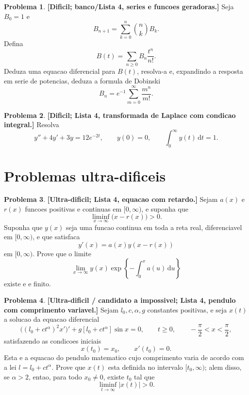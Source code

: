 \documentclass[10pt,a4paper]{amsart}
\renewcommand{\d}{\mathrm{d}}
\theoremstyle{definition}
\newtheorem{problema}{Problema}
\begin{document}
\begin{problema}
\textbf{[Dificil; banco/Lista 4, series e funcoes geradoras.]}
Seja $B_0=1$ e
\[
    B_{n+1}=\sum_{k=0}^n \binom{n}{k}B_k.
\]
Defina
\[
    B(t)=\sum_{n\ge 0}B_n\frac{t^n}{n!}.
\]
Deduza uma equacao diferencial para $B(t)$, resolva-a e, expandindo a
resposta em serie de potencias, deduza a formula de Dobinski
\[
    B_n=e^{-1}\sum_{m=0}^{\infty}\frac{m^n}{m!}.
\]
\end{problema}

\begin{problema}
\textbf{[Dificil; Lista 4, transformada de Laplace com condicao integral.]}
Resolva
\[
    y''+4y'+3y=12e^{-2t},
    \qquad y(0)=0,
    \qquad \int_0^\infty y(t)\,\d t=1.
\]
\end{problema}

\section*{Problemas ultra-dificeis}

\begin{problema}
\textbf{[Ultra-dificil; Lista 4, equacao com retardo.]}
Sejam $a(x)$ e $r(x)$ funcoes positivas e continuas em $[0,\infty)$, e
suponha que
\[
    \liminf_{x\to\infty}\bigl(x-r(x)\bigr)>0.
\]
Suponha que $y(x)$ seja uma funcao continua em toda a reta real,
diferenciavel em $[0,\infty)$, e que satisfaca
\[
    y'(x)=a(x)y(x-r(x))
\]
em $[0,\infty)$. Prove que o limite
\[
    \lim_{x\to\infty} y(x)\exp\left\{-\int_0^x a(u)\,\d u\right\}
\]
existe e e finito.
\end{problema}

\begin{problema}
\textbf{[Ultra-dificil / candidato a impossivel; Lista 4, pendulo com
comprimento variavel.]}
Sejam $l_0,c,\alpha,g$ constantes positivas, e seja $x(t)$ a solucao da
equacao diferencial
\[
    \bigl((l_0+ct^\alpha)^2x'\bigr)'
    +g[l_0+ct^\alpha]\sin x=0,
    \qquad t\ge 0,\qquad -\frac{\pi}{2}<x<\frac{\pi}{2},
\]
satisfazendo as condicoes iniciais
\[
    x(t_0)=x_0,\qquad x'(t_0)=0.
\]
Esta e a equacao do pendulo matematico cujo comprimento varia de acordo com
a lei $l=l_0+ct^\alpha$. Prove que $x(t)$ esta definida no intervalo
$[t_0,\infty)$; alem disso, se $\alpha>2$, entao, para todo $x_0\neq 0$,
existe $t_0$ tal que
\[
    \liminf_{t\to\infty}|x(t)|>0.
\]
\end{problema}
\end{document}
